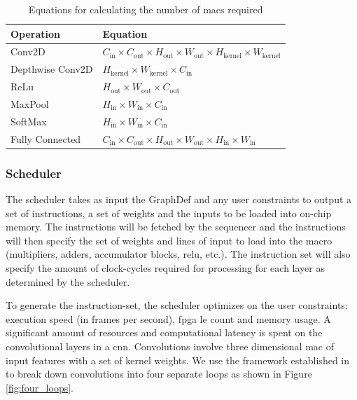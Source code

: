 \documentclass{uw-ece-wkrpt}
\begin{document}
\begin{table}
\centering
\caption{Equations for calculating the number of \glspl{mac} required}\label{tab:macs_required}
\begin{tabular}{ll}
\toprule
Operation        & Equation \\
\midrule
Conv2D           & $C_\mathrm{in} \times C_\mathrm{out} \times H_\mathrm{out} \times W_\mathrm{out} \times H_\mathrm{kernel} \times W_\mathrm{kernel}$ \\
Depthwise Conv2D & $H_\mathrm{kernel} \times W_\mathrm{kernel} \times C_\mathrm{in}$ \\
ReLu             & $H_\mathrm{out} \times W_\mathrm{out} \times C_\mathrm{out}$ \\
MaxPool          & $H_\mathrm{in} \times W_\mathrm{in} \times C_\mathrm{in}$ \\
SoftMax          & $H_\mathrm{in} \times W_\mathrm{in} \times C_\mathrm{in}$ \\
Fully Connected  & $C_\mathrm{in} \times C_\mathrm{out} \times H_\mathrm{out} \times W_\mathrm{out} \times H_\mathrm{in} \times W_\mathrm{in}$ \\
\bottomrule
\end{tabular}
\end{table}

\subsubsection{Scheduler}\label{sec:scheduler}

The scheduler takes as input the GraphDef and any user constraints to output a set of instructions, a set of weights and the inputs to be loaded into on-chip memory. The instructions will be fetched by the sequencer and the instructions will then specify the set of weights and lines of input to load into the macro (multipliers, adders, accumulator blocks, \gls{relu}, etc.). The instruction set will also specify the amount of clock-cycles required for processing for each layer as determined by the scheduler.

To generate the instruction-set, the scheduler optimizes on the user constraints: execution speed (in frames per second), \gls{fpga} \gls{le} count and memory usage. A significant amount of resources and computational latency is spent on the convolutional layers in a \gls{cnn}. Convolutions involve three dimensional \gls{mac} of input features with a set of \gls{kernel} weights. We use the framework established in \cite{Ma2017Optimizing-Loop} to break down convolutions into four separate loops as shown in Figure \ref{fig:four_loops}.
\end{document}
